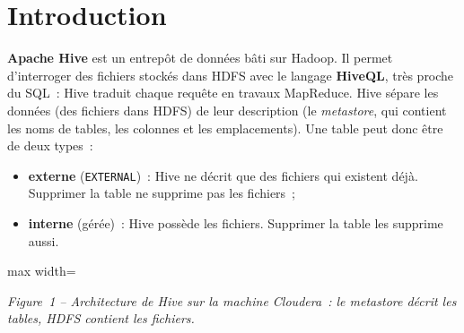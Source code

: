 \newpage
\section*{Introduction}
{}

\noindent \textbf{Apache Hive} est un entrepôt de données bâti sur Hadoop. Il permet d'interroger des fichiers stockés dans HDFS avec le langage \textbf{HiveQL}, très proche du SQL~: Hive traduit chaque requête en travaux MapReduce. Hive sépare les données (des fichiers dans HDFS) de leur description (le \textit{metastore}, qui contient les noms de tables, les colonnes et les emplacements). Une table peut donc être de deux types~:
\begin{itemize}
	\item \textbf{externe} (\texttt{EXTERNAL})~: Hive ne décrit que des fichiers qui existent déjà. Supprimer la table ne supprime pas les fichiers~;
	\item \textbf{interne} (gérée)~: Hive possède les fichiers. Supprimer la table les supprime aussi.
\end{itemize}

\begin{center}
\begin{adjustbox}{max width=\linewidth}
\end{adjustbox}\par\nobreak\smallskip
\small\textit{Figure~1 -- Architecture de Hive sur la machine Cloudera~: le metastore décrit les tables, HDFS contient les fichiers.}
\end{center}

